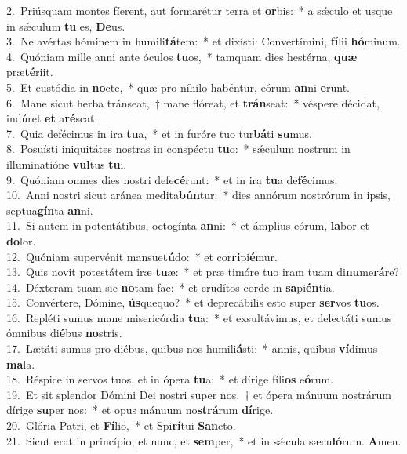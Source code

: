 {2.~}Priúsquam montes fíerent, aut formarétur terra et \textbf{or}bis:~* a sǽculo et usque in sǽculum \textbf{tu} es, \textbf{De}us.\\
{3.~}Ne avértas hóminem in humili\textbf{tá}tem:~* et dixísti: Convertímini, \textbf{fí}lii \textbf{hó}minum.\\
{4.~}Quóniam mille anni ante óculos \textbf{tu}os,~* tamquam dies hestérna, \textbf{quæ} præ\textbf{té}riit.\\
{5.~}Et custódia in \textbf{no}cte,~* quæ pro níhilo habéntur, eórum \textbf{an}ni \textbf{e}runt.\\
{6.~}Mane sicut herba tránseat,~† mane flóreat, et \textbf{trán}seat:~* véspere décidat, indúret \textbf{et} a\textbf{ré}scat.\\
{7.~}Quia defécimus in ira \textbf{tu}a,~* et in furóre tuo tur\textbf{bá}ti \textbf{su}mus.\\
{8.~}Posuísti iniquitátes nostras in conspéctu \textbf{tu}o:~* sǽculum nostrum in illuminatióne \textbf{vul}tus \textbf{tu}i.\\
{9.~}Quóniam omnes dies nostri defe\textbf{cé}runt:~* et in ira \textbf{tu}a de\textbf{fé}cimus.\\
{10.~}Anni nostri sicut aránea medita\textbf{bún}tur:~* dies annórum nostrórum in ipsis, septua\textbf{gín}ta \textbf{an}ni.\\
{11.~}Si autem in potentátibus, octogínta \textbf{an}ni:~* et ámplius eórum, \textbf{la}bor et \textbf{do}lor.\\
{12.~}Quóniam supervénit mansue\textbf{tú}do:~* et cor\textbf{ri}pi\textbf{é}mur.\\
{13.~}Quis novit potestátem iræ \textbf{tu}æ:~* et præ timóre tuo iram tuam di\textbf{nu}me\textbf{rá}re?\\
{14.~}Déxteram tuam sic \textbf{no}tam fac:~* et erudítos corde in \textbf{sa}pi\textbf{én}tia.\\
{15.~}Convértere, Dómine, \textbf{ús}quequo?~* et deprecábilis esto super \textbf{ser}vos \textbf{tu}os.\\
{16.~}Repléti sumus mane misericórdia \textbf{tu}a:~* et exsultávimus, et delectáti sumus ómnibus di\textbf{é}bus \textbf{no}stris.\\
{17.~}Lætáti sumus pro diébus, quibus nos humili\textbf{á}sti:~* annis, quibus \textbf{ví}dimus \textbf{ma}la.\\
{18.~}Réspice in servos tuos, et in ópera \textbf{tu}a:~* et dírige fíli\textbf{os} e\textbf{ó}rum.\\
{19.~}Et sit splendor Dómini Dei nostri super nos,~† et ópera mánuum nostrárum dírige \textbf{su}per nos:~* et opus mánuum no\textbf{strá}rum \textbf{dí}rige.\\
{20.~}Glória Patri, et \textbf{Fí}lio,~* et Spi\textbf{rí}tui \textbf{San}cto.\\
{21.~}Sicut erat in princípio, et nunc, et \textbf{sem}per,~* et in sǽcula sæcu\textbf{ló}rum. \textbf{A}men.\\
